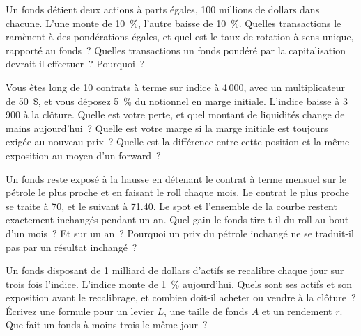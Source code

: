 \begin{question}\label{iq:iv2:etfs-futures-and-index-arbitrage:9}
Un fonds détient deux actions à parts égales, 100 millions de dollars dans chacune. L'une monte de 10~\%, l'autre baisse de 10~\%. Quelles transactions le ramènent à des pondérations égales, et quel est le taux de rotation à sens unique, rapporté au fonds~? Quelles transactions un fonds pondéré par la capitalisation devrait-il effectuer~? Pourquoi~?
\end{question}

\begin{question}\label{iq:iv2:etfs-futures-and-index-arbitrage:10}
Vous êtes long de 10 contrats à terme sur indice à 4\,000, avec un multiplicateur de 50~\$, et vous déposez 5~\% du notionnel en marge initiale. L'indice baisse à 3\,900 à la clôture. Quelle est votre perte, et quel montant de liquidités change de mains aujourd'hui~? Quelle est votre marge si la marge initiale est toujours exigée au nouveau prix~? Quelle est la différence entre cette position et la même exposition au moyen d'un forward~?
\end{question}

\begin{question}\label{iq:iv2:etfs-futures-and-index-arbitrage:11}
Un fonds reste exposé à la hausse en détenant le contrat à terme mensuel sur le pétrole le plus proche et en faisant le roll chaque mois. Le contrat le plus proche se traite à 70, et le suivant à 71.40. Le spot et l'ensemble de la courbe restent exactement inchangés pendant un an. Quel gain le fonds tire-t-il du roll au bout d'un mois~? Et sur un an~? Pourquoi un prix du pétrole inchangé ne se traduit-il pas par un résultat inchangé~?
\end{question}

\begin{question}\label{iq:iv2:etfs-futures-and-index-arbitrage:12}
Un fonds disposant de 1 milliard de dollars d'actifs se recalibre chaque jour sur trois fois l'indice. L'indice monte de 1~\% aujourd'hui. Quels sont ses actifs et son exposition avant le recalibrage, et combien doit-il acheter ou vendre à la clôture~? Écrivez une formule pour un levier $L$, une taille de fonds $A$ et un rendement $r$. Que fait un fonds à moins trois le même jour~?
\end{question}

